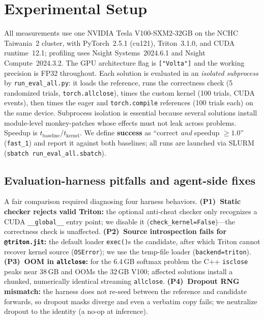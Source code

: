 \documentclass[conference]{IEEEtran}
\begin{document}
\section{Experimental Setup}
All measurements use one NVIDIA Tesla V100-SXM2-32GB on the NCHC Taiwania~2
cluster, with PyTorch~2.5.1 (cu121), Triton~3.1.0, and CUDA runtime~12.1;
profiling uses Nsight Systems~2024.6.1 and Nsight Compute~2024.3.2. The GPU
architecture flag is \texttt{["Volta"]} and the working precision is FP32
throughout. Each solution is evaluated in an \emph{isolated subprocess} by
\texttt{run\_eval\_all.py}: it loads the reference, runs the correctness check
(5 randomized trials, \texttt{torch.allclose}), times the custom kernel (100
trials, CUDA events), then times the eager and \texttt{torch.compile} references
(100 trials each) on the same device. Subprocess isolation is essential because
several solutions install module-level monkey-patches whose effects must not
leak across problems. Speedup is $t_\text{baseline}/t_\text{kernel}$. We define
\textbf{success} as ``correct \emph{and} speedup $\ge 1.0$'' (\texttt{fast\_1})
and report it against both baselines; all runs are launched via SLURM
(\texttt{sbatch run\_eval\_all.sbatch}).

\subsection{Evaluation-harness pitfalls and agent-side fixes}
A fair comparison required diagnosing four harness behaviors.
\textbf{(P1)~Static checker rejects valid Triton:} the optional anti-cheat
checker only recognizes a CUDA \texttt{\_\_global\_\_} entry point; we disable it
(\texttt{check\_kernel=False})---the correctness check is unaffected.
\textbf{(P2)~Source introspection fails for \texttt{@triton.jit}:} the default
loader \texttt{exec()}s the candidate, after which Triton cannot recover kernel
source (\texttt{OSError}); we use the temp-file loader (\texttt{backend=triton}).
\textbf{(P3)~OOM in \texttt{allclose}:} for the 6.4\,GB softmax problem the C++
\texttt{isclose} peaks near 38\,GB and OOMs the 32\,GB V100; affected solutions
install a chunked, numerically identical streaming \texttt{allclose}.
\textbf{(P4)~Dropout RNG mismatch:} the harness does not re-seed between the
reference and candidate forwards, so dropout masks diverge and even a verbatim
copy fails; we neutralize dropout to the identity (a no-op at inference).

\end{document}
